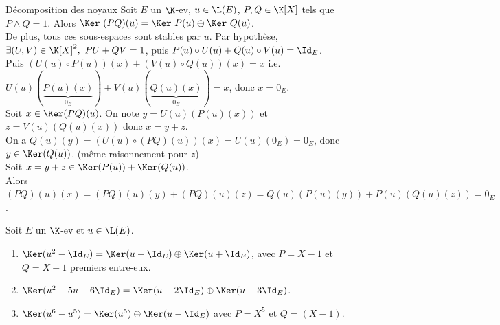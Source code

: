 \documentclass[11pt]{article}
\begin{document}
\begin{thm}{Décomposition des noyaux}{}
    Soit $E$ un $\K$-ev, $u\in\L(E)$, $P,Q\in\K[X]$ tels que $P\land Q=1$. Alors $\Ker~(PQ)(u)=\Ker~P(u) \oplus \Ker~Q(u)$.\\
    De plus, tous ces sous-espaces sont stables par $u$.
    \tcblower
    Par hypothèse, $\exists (U,V)\in\K[X]^2, ~ PU+QV=1$, puis $P(u)\circ U(u)+Q(u)\circ V(u) = \Id_E$.\\
    Puis $(U(u)\circ P(u))(x) + (V(u)\circ Q(u))(x)=x$ i.e. $U(u)(\underbrace{P(u)(x)}_{0_E})+V(u)(\underbrace{Q(u)(x)}_{0_E})=x$, donc $x=0_E$.\\
    \boxed{\subset} Soit $x\in \Ker(PQ)(u)$. On note $y=U(u)(P(u)(x))$ et $z=V(u)(Q(u)(x))$ donc $x=y+z$.\\
    On a $Q(u)(y)=(U(u) \circ (PQ)(u))(x) = U(u)(0_E)=0_E$, donc $y\in\Ker(Q(u))$. (même raisonnement pour $z$)\\
    \boxed{\supset} Soit $x=y+z\in\Ker(P(u))+\Ker(Q(u))$.\\
    Alors $(PQ)(u)(x)=(PQ)(u)(y)+(PQ)(u)(z)=Q(u)(P(u)(y))+P(u)(Q(u)(z))=0_E$.
\end{thm}

\vspace*{-0.5cm}

\begin{ex}{}{}
    Soit $E$ un $\K$-ev et $u\in\L(E)$.
    \begin{enumerate}
        \item $\Ker(u^2-\Id_E)=\Ker(u-\Id_E)\oplus\Ker(u+\Id_E)$, avec $P=X-1$ et $Q=X+1$ premiers entre-eux.
        \item $\Ker(u^2-5u+6\Id_E)=\Ker(u-2\Id_E) \oplus \Ker(u-3\Id_E)$.
        \item $\Ker(u^6 - u^5)=\Ker(u^5)\oplus\Ker(u-\Id_E)$ avec $P=X^5$ et $Q=(X-1)$.
    \end{enumerate}
\end{ex}

\vspace*{-0.5cm}
\end{document}
